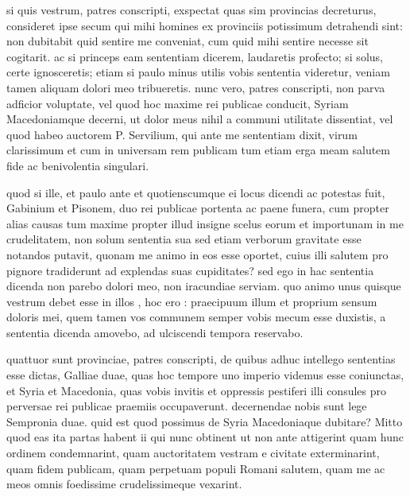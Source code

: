 
 si quis vestrum, patres conscripti, exspectat quas sim provincias decreturus, consideret ipse secum qui mihi homines ex provinciis potissimum detrahendi sint: non dubitabit quid sentire me conveniat, cum quid mihi sentire necesse sit cogitarit. ac si princeps eam sententiam dicerem, laudaretis profecto; si solus, certe ignosceretis; etiam si paulo minus utilis vobis sententia videretur, veniam tamen aliquam dolori meo tribueretis. nunc vero, patres conscripti, non parva adficior voluptate, vel quod hoc maxime rei publicae conducit, Syriam Macedoniamque decerni, ut dolor meus nihil a communi utilitate dissentiat, vel quod habeo auctorem P. Servilium, qui ante me sententiam dixit, virum clarissimum et cum in universam rem publicam tum etiam erga meam salutem fide ac benivolentia singulari.

 quod si ille, et paulo ante et quotienscumque ei locus dicendi ac potestas fuit, Gabinium et Pisonem, duo rei publicae portenta ac paene funera, cum propter alias causas tum maxime propter illud insigne scelus eorum et importunam in me crudelitatem, non solum sententia sua sed etiam verborum gravitate esse notandos putavit, quonam me animo in eos esse oportet, cuius illi salutem pro pignore tradiderunt ad explendas suas cupiditates? sed ego in hac sententia dicenda non parebo dolori meo, non iracundiae serviam. quo animo unus quisque vestrum debet esse in illos , hoc ero : praecipuum illum et proprium sensum doloris mei, quem tamen vos communem semper vobis mecum esse duxistis, a sententia dicenda amovebo, ad ulciscendi tempora reservabo.

 quattuor sunt provinciae, patres conscripti, de quibus adhuc intellego sententias esse dictas, Galliae duae, quas hoc tempore uno imperio videmus esse coniunctas, et Syria et Macedonia, quas vobis invitis et oppressis pestiferi illi consules pro perversae rei publicae praemiis occupaverunt. decernendae nobis sunt lege Sempronia duae. quid est quod possimus de Syria Macedoniaque dubitare? Mitto quod eas ita partas habent ii qui nunc obtinent ut non ante attigerint quam hunc ordinem condemnarint, quam auctoritatem vestram e civitate exterminarint, quam fidem publicam, quam perpetuam populi Romani salutem, quam me ac meos omnis foedissime crudelissimeque vexarint.

